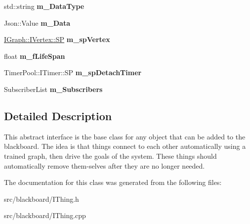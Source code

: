 \begin{DoxyCompactItemize}
std\+::string {\bfseries m\+\_\+\+Data\+Type}
\item 
\mbox{\label{class_i_thing_a0b47a4734391e189e5898902e78f02eb}} 
Json\+::\+Value {\bfseries m\+\_\+\+Data}
\item 
\mbox{\label{class_i_thing_aa9369e0c21c8d7a70e5dd8e99992734a}} 
\hyperlink{class_i_graph_1_1_i_vertex_af72b9df91f110bc7824c608c10cc819c}{I\+Graph\+::\+I\+Vertex\+::\+SP} {\bfseries m\+\_\+sp\+Vertex}
\item 
\mbox{\label{class_i_thing_a8e51811cda850ebcf2588181561d164b}} 
float {\bfseries m\+\_\+f\+Life\+Span}
\item 
\mbox{\label{class_i_thing_aa487afb3428e4a2a2d258eff1cf937ab}} 
Timer\+Pool\+::\+I\+Timer\+::\+SP {\bfseries m\+\_\+sp\+Detach\+Timer}
\item 
\mbox{\label{class_i_thing_aff0f41013e03bea8fd5a2d2a1ed30d48}} 
Subscriber\+List {\bfseries m\+\_\+\+Subscribers}
\end{DoxyCompactItemize}


\subsection{Detailed Description}
This abstract interface is the base class for any object that can be added to the blackboard. The idea is that things connect to each other automatically using a trained graph, then drive the goals of the system. These things should automatically remove them-\/selves after they are no longer needed. 

The documentation for this class was generated from the following files\+:\begin{DoxyCompactItemize}
\item 
src/blackboard/I\+Thing.\+h\item 
src/blackboard/I\+Thing.\+cpp\end{DoxyCompactItemize}
